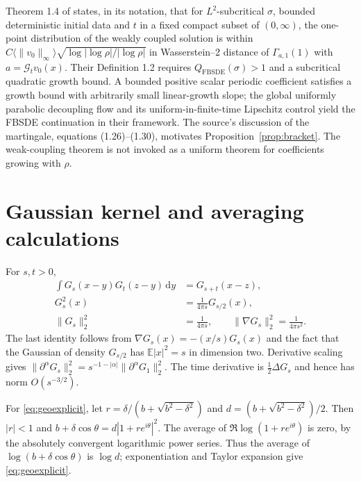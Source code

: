 \documentclass[11pt]{article}
\numberwithin{equation}{section}
\theoremstyle{definition}
\theoremstyle{remark}
\newcommand{\E}{\mathbb E}
\newcommand{\clG}{\mathcal G}
\newcommand{\dd}{\,\mathrm d}
\begin{document}
Theorem 1.4 of \cite{DG} states, in its notation, that for $L^2$-subcritical $\sigma$, bounded deterministic initial data and $t$ in a fixed compact subset of $(0,\infty)$, the one-point distribution of the weakly coupled solution is within $C\langle\|v_0\|_\infty\rangle\sqrt{\log|\log\rho|/|\log\rho|}$ in Wasserstein--2 distance of $\Gamma_{a,1}(1)$ with $a=\clG_tv_0(x)$. Their Definition 1.2 requires $Q_{\mathrm{FBSDE}}(\sigma)>1$ and a subcritical quadratic growth bound. A bounded positive scalar periodic coefficient satisfies a growth bound with arbitrarily small linear-growth slope; the global uniformly parabolic decoupling flow and its uniform-in-finite-time Lipschitz control yield the FBSDE continuation in their framework. The source's discussion of the martingale, equations (1.26)--(1.30), motivates Proposition~\ref{prop:bracket}. The weak-coupling theorem is not invoked as a uniform theorem for coefficients growing with $\rho$.

\section{Gaussian kernel and averaging calculations}\label{app:gaussian}
For $s,t>0$,
\begin{align*}
 \int G_s(x-y)G_t(z-y)\dd y&=G_{s+t}(x-z),\\
 G_s^2(x)&=\frac{1}{4\pi s}G_{s/2}(x),\\
 \|G_s\|_2^2&=\frac1{4\pi s},\qquad
 \|\nabla G_s\|_2^2=\frac1{4\pi s^2}.
\end{align*}
The last identity follows from $\nabla G_s(x)=-(x/s)G_s(x)$ and the fact that the Gaussian of density $G_{s/2}$ has $\E|x|^2=s$ in dimension two. Derivative scaling gives $\|\partial^\alpha G_s\|_2^2=s^{-1-|\alpha|}\|\partial^\alpha G_1\|_2^2$. The time derivative is $\frac12\Delta G_s$ and hence has norm $O(s^{-3/2})$.

For \eqref{eq:geoexplicit}, let $r=\delta/(b+\sqrt{b^2-\delta^2})$ and $d=(b+\sqrt{b^2-\delta^2})/2$. Then $|r|<1$ and $b+\delta\cos\theta=d|1+re^{i\theta}|^2$. The average of $\Re\log(1+re^{i\theta})$ is zero, by the absolutely convergent logarithmic power series. Thus the average of $\log(b+\delta\cos\theta)$ is $\log d$; exponentiation and Taylor expansion give \eqref{eq:geoexplicit}.
\end{document}
